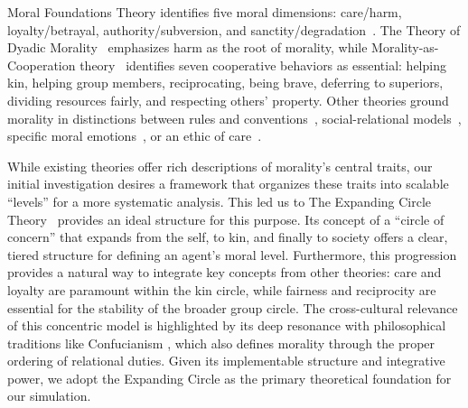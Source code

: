 \documentclass[letterpaper]{article} %
\begin{document}
Moral Foundations Theory identifies five moral dimensions: care/harm, loyalty/betrayal, authority/subversion, and sanctity/degradation~\citep{Haidt2007MFT}. The Theory of Dyadic Morality~\citep{Gray2012TDM} emphasizes harm as the root of morality, while Morality-as-Cooperation theory~\citep{Curry2019MAC} identifies seven cooperative behaviors as essential: helping kin, helping group members, reciprocating, being brave, deferring to superiors, dividing resources fairly, and respecting others' property. Other theories ground morality in distinctions between rules and conventions~\citep{Turiel1983MDT}, social-relational models~\citep{Fiske1992RMT, Rai2011RRT}, specific moral emotions~\citep{Rozin1999CAD}, or an ethic of care~\citep{Gilligan1982EOC}.


While existing theories offer rich descriptions of morality's central traits, our initial investigation desires a framework that organizes these traits into scalable ``levels'' for a more systematic analysis. This led us to The Expanding Circle Theory~\citep{singer1981expanding} provides an ideal structure for this purpose. Its concept of a ``circle of concern'' that expands from the self, to kin, and finally to society offers a clear, tiered structure for defining an agent's moral level. Furthermore, this progression provides a natural way to integrate key concepts from other theories: care and loyalty are paramount within the kin circle, while fairness and reciprocity are essential for the stability of the broader group circle. The cross-cultural relevance of this concentric model is highlighted by its deep resonance with philosophical traditions like Confucianism \citep{fei1992from}, which also defines morality through the proper ordering of relational duties. Given its implementable structure and integrative power, we adopt the Expanding Circle as the primary theoretical foundation for our simulation.

\end{document}
